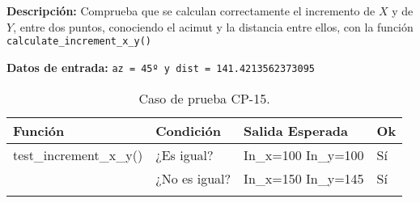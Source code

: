 \textbf{Descripción:} Comprueba que se calculan correctamente el incremento de $X$ y de $Y$, entre dos puntos, conociendo el acimut y la distancia entre ellos, con la función \texttt{calculate\_increment\_x\_y()}

\textbf{Datos de entrada:} \texttt{az = 45º y dist = 141.4213562373095}
\newpage

\begin{longtable}[]{@{}llll@{}}
\toprule
\begin{minipage}[b]{0.6\columnwidth}\raggedright\strut
Función\strut
\end{minipage} & \begin{minipage}[b]{0.20\columnwidth}\raggedright\strut
Condición\strut
\end{minipage} & \begin{minipage}[b]{0.15\columnwidth}\raggedright\strut
Salida Esperada\strut
\end{minipage} & \begin{minipage}[b]{0.05\columnwidth}\raggedright\strut
Ok\strut
\end{minipage}\tabularnewline
\midrule
\endhead
\begin{minipage}[t]{0.6\columnwidth}\raggedright\strut
\small{test\_increment\_x\_y()}\strut
\end{minipage} & \begin{minipage}[t]{0.20\columnwidth}\raggedright\strut
¿Es igual?\strut
\end{minipage} & \begin{minipage}[t]{0.15\columnwidth}\raggedright\strut
In\_x=100 In\_y=100\strut
\end{minipage} & \begin{minipage}[t]{0.05\columnwidth}\raggedright\strut
Sí\strut
\end{minipage}\tabularnewline
\begin{minipage}[t]{0.6\columnwidth}\raggedright\strut
\strut
\end{minipage} & \begin{minipage}[t]{0.20\columnwidth}\raggedright\strut
¿No es igual?\strut
\end{minipage} & \begin{minipage}[t]{0.15\columnwidth}\raggedright\strut
In\_x=150 In\_y=145\strut
\end{minipage} & \begin{minipage}[t]{0.05\columnwidth}\raggedright\strut
Sí\strut
\end{minipage}\tabularnewline

\bottomrule
\caption{Caso de prueba CP-15.}
\end{longtable}


